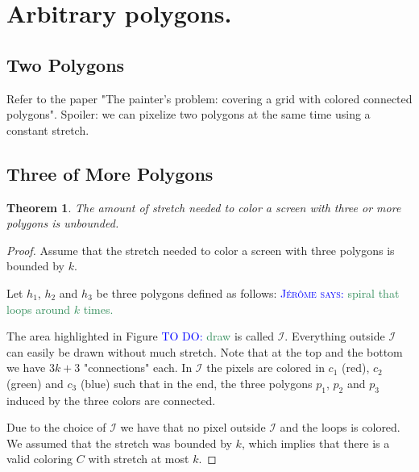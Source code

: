 \documentclass{paper}
\newtheorem{theorem}{Theorem}
\newcommand{\mremark}[3]{\textcolor{blue}{\textsc{#1 #2:}} \textcolor{SeaGreen}{\textsf{#3}}}
\newcommand{\jerome}[2][says]{\mremark{J\'er\^ome}{#1}{#2}}
\newcommand{\todo}[2][DO]{\mremark{TO}{#1}{#2}}
\newcommand{\draw}{\todo{draw}}
\newcommand{\spg}{\mathcal{S\!P}}
\newcommand{\ixi}{\mathcal{I}}
\begin{document}
{\section{Arbitrary polygons.}
\label{sec:arbitrary}

\subsection{Two Polygons}

Refer to the paper "The painter’s problem: covering a grid with colored connected polygons".
Spoiler: we can pixelize two polygons at the same time using a constant stretch.

\subsection{Three of More Polygons}

\begin{theorem}\label{thm:unbouded}
The amount of stretch needed to color a screen with three or more polygons is unbounded.
\end{theorem}
\begin{proof}
Assume that the stretch needed to color a screen with three polygons is bounded by $k$.

Let $h_1$, $h_2$ and $h_3$ be three polygons defined as follows:
\jerome{spiral that loops around $k$ times.}

The area highlighted in Figure \todo{draw} is called $\ixi$.
Everything outside $\ixi$ can easily be drawn without much stretch.
Note that at the top and the bottom we have $3k+3$ "connections" each. In $\ixi$ the pixels are colored in $c_1$ (red), $c_2$ (green) and $c_3$ (blue) such that in the end, the three polygons $p_1$, $p_2$ and $p_3$ induced by the three colors are connected.


Due to the choice of $\ixi$ we have that no pixel outside $\ixi$ and the loops is colored.
We assumed that the stretch was bounded by $k$, which implies that there is a valid coloring $C$ with stretch at most $k$.


\end{proof}}
\end{document}
